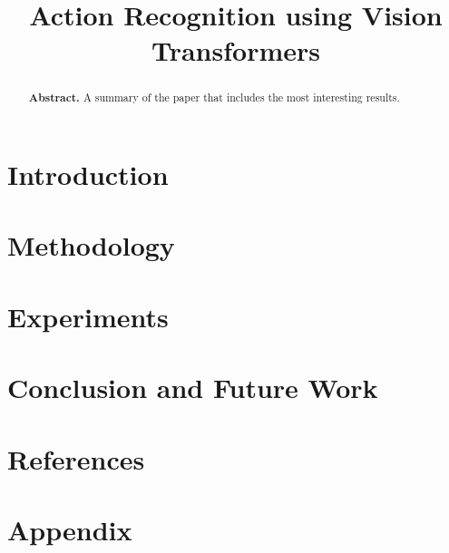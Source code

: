 \documentclass[twocolumn,showpacs,%
  nofootinbib,aps,superscriptaddress,%
  eqsecnum,prd,notitlepage,showkeys,10pt]{IEEEtran}
\begin{document}
\title{Action Recognition using Vision Transformers}
\author{
}
\maketitle

\begin{abstract}
\textbf{Abstract.} A summary of the paper that includes the most interesting results.
\end{abstract}

\section{Introduction}




\section{Methodology}




\section{Experiments}




\section{Conclusion and Future Work}


\section{References}

\section{Appendix}
\end{document}
